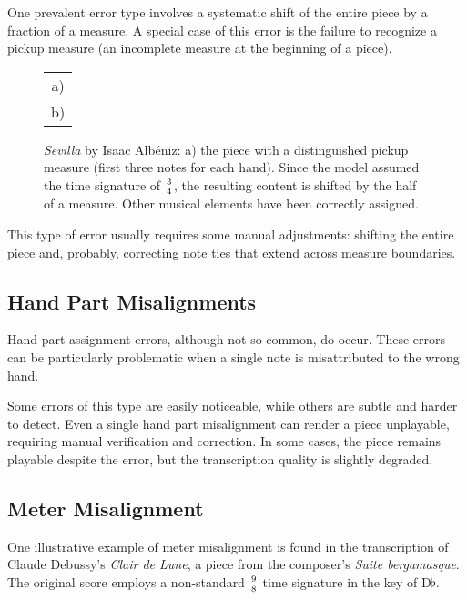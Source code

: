 One prevalent error type involves a systematic shift of the entire piece by a fraction of a measure. A special case of this error is the failure to recognize a pickup measure (an incomplete measure at the beginning of a piece).

\begin{figure}[ht!]
\centering
\begin{tabular}{c}a)
 \\ b)

\end{tabular}
\caption[\emph{Sevilla} by Isaac Albéniz.]{\emph{Sevilla} by Isaac Albéniz: a) the piece with a distinguished pickup measure (first three notes for each hand). Since the model assumed the time signature of ${3 \atop 4}$, the resulting content is shifted by the half of a measure. Other musical elements have been correctly assigned.}
\label{albeniz}
\end{figure}

This type of error usually requires some manual adjustments: shifting the entire piece and, probably, correcting note ties that extend across measure boundaries.

\subsection{Hand Part Misalignments}

Hand part assignment errors, although not so common, do occur. These errors can be particularly problematic when a single note is misattributed to the wrong hand.

Some errors of this type are easily noticeable, while others are subtle and harder to detect. Even a single hand part misalignment can render a piece unplayable, requiring manual verification and correction. In some cases, the piece remains playable despite the error, but the transcription quality is slightly degraded.

\subsection{Meter Misalignment}\label{meter_misalignment}

One illustrative example of meter misalignment is found in the transcription of Claude Debussy’s \emph{Clair de Lune}, a piece from the composer’s \emph{Suite bergamasque}. The original score employs a non-standard ${9 \atop 8}$ time signature in the key of D$\flat$.

